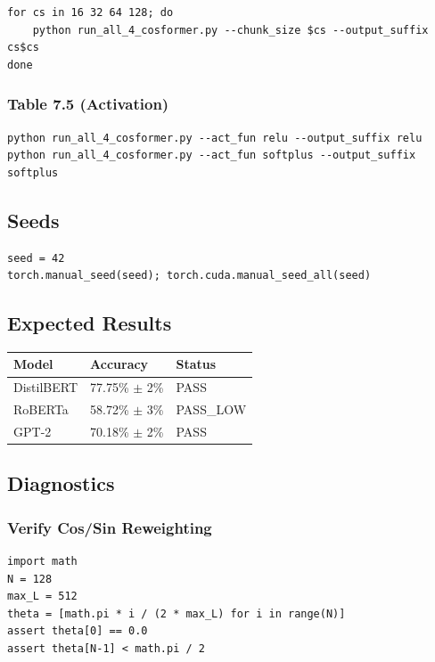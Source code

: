 \begin{lstlisting}
for cs in 16 32 64 128; do
    python run_all_4_cosformer.py --chunk_size $cs --output_suffix cs$cs
done
\end{lstlisting}

\subsubsection{Table 7.5 (Activation)}

\begin{lstlisting}
python run_all_4_cosformer.py --act_fun relu --output_suffix relu
python run_all_4_cosformer.py --act_fun softplus --output_suffix softplus
\end{lstlisting}

\subsection{Seeds}

\begin{lstlisting}
seed = 42
torch.manual_seed(seed); torch.cuda.manual_seed_all(seed)
\end{lstlisting}

\subsection{Expected Results}

\begin{table}[H]
\centering
\small
\begin{tabular}{lll}
\toprule
\textbf{Model} & \textbf{Accuracy} & \textbf{Status} \\
\midrule
DistilBERT & 77.75\% $\pm$ 2\% & PASS \\
RoBERTa & 58.72\% $\pm$ 3\% & PASS_LOW \\
GPT-2 & 70.18\% $\pm$ 2\% & PASS \\
\bottomrule
\end{tabular}
\end{table}

\subsection{Diagnostics}

\subsubsection{Verify Cos/Sin Reweighting}

\begin{lstlisting}
import math
N = 128
max_L = 512
theta = [math.pi * i / (2 * max_L) for i in range(N)]
assert theta[0] == 0.0
assert theta[N-1] < math.pi / 2
\end{lstlisting}

